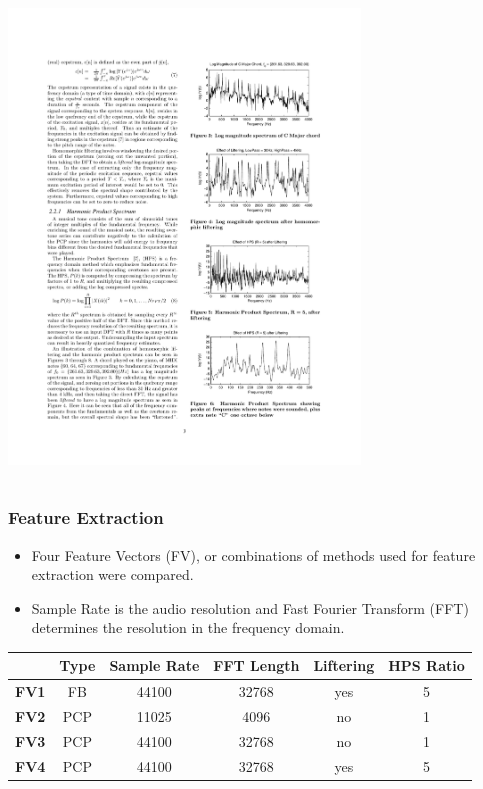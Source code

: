 \documentclass{beamer}
\begin{document}
\begin{frame}
\begin{columns}
\begin{column}{.5\textwidth}
	\includegraphics[width=0.70\textwidth]{freq3.pdf}
	\end{column}
	\end{columns}
\end{frame}

\begin{frame}
	\frametitle{Feature Extraction}
	 \begin{itemize}
 	\item Four Feature Vectors (FV), or combinations of methods used for feature extraction were compared.
 	\item Sample Rate is the audio resolution and Fast Fourier Transform (FFT) determines the resolution in the frequency domain. 
 \end{itemize}
 
	\begin{table}
\centering
\begin{tabular}{|c|c|c|c|c|c|} \hline
 & \textbf{Type} & \textbf{Sample Rate} & \textbf{FFT Length} & \textbf{Liftering} & \textbf{HPS Ratio} \\ \hline
\textbf{FV1} & FB & 44100 & 32768 & yes & 5 \\ \hline
\textbf{FV2} & PCP & 11025 & 4096 & no & 1 \\ \hline
\textbf{FV3} & PCP & 44100 & 32768 & no & 1 \\ \hline
\textbf{FV4} & PCP & 44100 & 32768 & yes & 5 \\ \hline
\end{tabular}
\label{tab:tab2}
\end{table} 
\end{frame}
\end{document}
